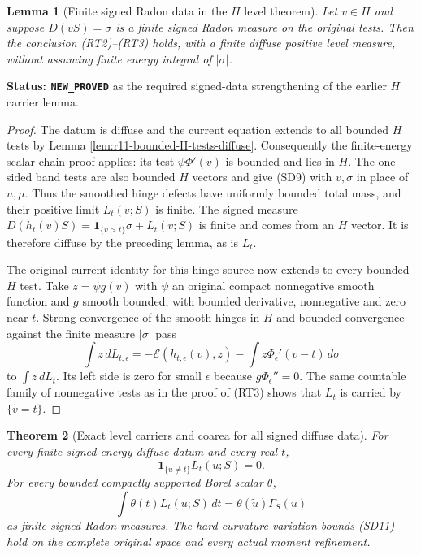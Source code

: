 \documentclass[11pt,a4paper]{article}
\numberwithin{equation}{section}
\newtheorem{theorem}{Theorem}[section]
\newtheorem{lemma}[theorem]{Lemma}
\theoremstyle{definition}
\theoremstyle{remark}
\begin{document}
\begin{lemma}[Finite signed Radon data in the $H$ level theorem]
\label{lem:r11-H-level-carrier-finite-signed}
Let $v\in H$ and suppose $D(vS)=\sigma$ is a finite signed
Radon measure on the original tests.  Then the conclusion
(RT2)--(RT3) holds, with a finite diffuse positive level
measure, without assuming finite energy integral of
$|\sigma|$.
\end{lemma}

\noindent\textbf{Status: \texttt{NEW\_PROVED}} as the required
signed-data strengthening of the earlier $H$ carrier lemma.

\begin{proof}
The datum is diffuse and the current equation extends to
all bounded $H$ tests by Lemma
\ref{lem:r11-bounded-H-tests-diffuse}.
Consequently the finite-energy scalar chain proof applies:
its test $\psi\Phi'(v)$ is bounded and lies in $H$.
The one-sided band tests are also bounded $H$ vectors and
give (SD9) with $v,\sigma$ in place of $u,\mu$.
Thus the smoothed hinge defects have uniformly bounded
total mass, and their positive limit $L_t(v;S)$ is finite.
The signed measure
$D(h_t(v)S)=\mathbf1_{\{v>t\}}\sigma+L_t(v;S)$ is finite
and comes from an $H$ vector.  It is therefore diffuse by
the preceding lemma, as is $L_t$.

The original current identity for this hinge source now
extends to every bounded $H$ test.  Take
$z=\psi g(v)$ with $\psi$ an original compact nonnegative
smooth function and $g$ smooth bounded, with bounded
derivative, nonnegative and zero near $t$.
Strong convergence of the smooth hinges in $H$ and bounded
convergence against the finite measure $|\sigma|$ pass
\[
 \int z\,dL_{t,\epsilon}
     =-\mathcal E(h_{t,\epsilon}(v),z)
              -\int z\Phi_\epsilon'(v-t)\,d\sigma
\]
to $\int z\,dL_t$.
Its left side is zero for small $\epsilon$ because
$g\Phi_\epsilon''=0$.  The same countable family of
nonnegative tests as in the proof of (RT3) shows that
$L_t$ is carried by $\{\widetilde v=t\}$.
\end{proof}

\begin{theorem}[Exact level carriers and coarea for all signed diffuse data]
\label{thm:r11-signed-diffuse-exact-level}
For every finite signed energy-diffuse datum and every real $t$,
\[
                    \mathbf1_{\{\widetilde u\ne t\}}L_t(u;S)=0.
 \tag{SD13}
\]
For every bounded compactly supported Borel scalar $\theta$,
\[
                \int\theta(t)L_t(u;S)\,dt
                         =\theta(\widetilde u)\Gamma_S(u)
 \tag{SD14}
\]
as finite signed Radon measures.  The hard-curvature
variation bounds (SD11) hold on the complete original
space and every actual moment refinement.
\end{theorem}
\end{document}
